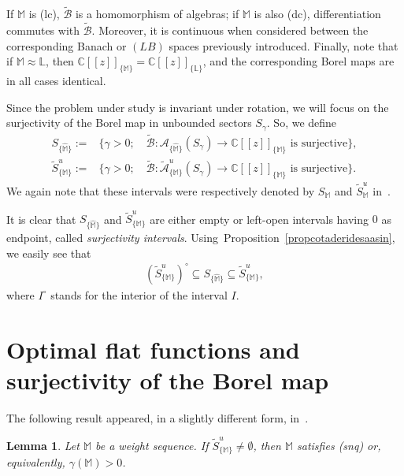 \documentclass[11pt,a4paper]{article}
\theoremstyle{plain}
\newtheorem{lemma}[theo]{Lemma}
\theoremstyle{definition}
\newcommand{\C}{\mathbb{C}}
\newcommand{\M}{\mathbb{M}}
\newcommand{\hM}{\widehat{\M}}
\newcommand{\bL}{\mathbb{L}}
\def\ga{\gamma}
\begin{document}
If $\M$ is (lc), $\widetilde{\mathcal{B}}$ is a homomorphism of algebras; if $\M$ is also (dc), differentiation commutes with $\widetilde{\mathcal{B}}$. Moreover, it is continuous when considered between the corresponding Banach or $(LB)$ spaces previously introduced. Finally, note that if $\M\approx\bL$, then $\C[[z]]_{\{\M\}}=\C[[z]]_{\{\bL\}}$, and the corresponding Borel maps are in all cases identical.

Since the problem under study is invariant under rotation, we will focus on the surjectivity of the Borel map in unbounded sectors $S_{\gamma}$. So, we define
\begin{align*}
S_{\{\hM\}}:=&\{\gamma>0; \quad \widetilde{\mathcal{B}}:\mathcal{A}_{\{\hM\}}(S_\gamma)\longrightarrow \C[[z]]_{\{\M\}} \text{ is surjective}\} ,\\
\widetilde{S}^u_{\{\M\}}:=&\{\gamma>0; \quad\widetilde{\mathcal{B}}:\widetilde{\mathcal{A}}^u_{\{\M\}}(S_\gamma)\longrightarrow \C[[z]]_{\{\M\}} \text{ is surjective}\}.
\end{align*}
We again note that these intervals were respectively denoted by $S_{\M}$ and $\widetilde{S}^u_{\M}$
in~\cite{JimenezSanzSchindlInjectSurject}.\par

It is clear that $S_{\{\hM\}}$ and $\widetilde{S}^u_{\{\M\}}$
are either empty or left-open intervals  having $0$ as endpoint, called \emph{surjectivity intervals}.
Using~Proposition~\ref{propcotaderidesaasin},
we easily see that
\begin{align}
(\widetilde{S}^u_{\{\M\}})^{\circ}\subseteq S_{\{\hM\}}\subseteq \widetilde{S}^u_{\{\M\}},
\label{equaContentionSurjectIntervals}
\end{align}
where $I^{\circ}$ stands for the interior of the interval $I$.



\section{Optimal flat functions and surjectivity of the Borel map}\label{sectFlatFunctions}


The following result appeared, in a slightly different form, in~\cite[Lemma~4.5]{JimenezSanzSchindlInjectSurject}.

\begin{lemma}\label{lemma.SurjectImpliesgammaMpositive}
Let $\M$ be a weight sequence. If $\widetilde{S}^u_{\{\M\}}\neq\emptyset$, then $\M$ satisfies (snq) or, equivalently, $\ga(\M) >0$.
\end{lemma}
\end{document}
